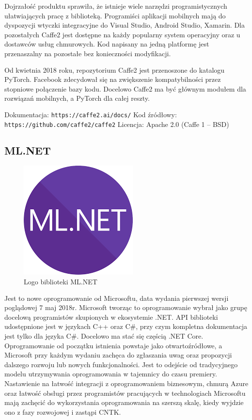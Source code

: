 \documentclass[12pt,a4paper,twoside,titlepage,openright]{book}
\begin{document}
\begin{itemize}
\begin{itemize}
Dojrzałość produktu sprawiła, że istnieje wiele narzędzi programistycznych ułatwiających pracę z biblioteką. Programiści aplikacji mobilnych mają do dyspozycji wtyczki integracyjne do Visual Studio, Android Studio, Xamarin. Dla pozostałych Caffe2 jest dostępne na każdy popularny system operacyjny oraz u dostawców usług chmurowych. Kod napisany na jedną platformę jest przenaszalny na pozostałe bez konieczności modyfikacji.

Od kwietnia 2018 roku, repozytorium Caffe2 jest przenoszone do katalogu PyTorch. Facebook zdecydował się na zwiększenie kompatybilności przez stopniowe połączenie bazy kodu. Docelowo Caffe2 ma być głównym modułem dla rozwiązań mobilnych, a PyTorch dla całej reszty.

\noindent
\newline
Dokumentacja: \texttt{https://caffe2.ai/docs/}
\newline
Kod źródłowy: \texttt{https://github.com/caffe2/caffe2}
\newline
Licencja: Apache 2.0 (Caffe 1 -- BSD)


\subsection{ML.NET}
\begin{figure}[h]
	\centering
			\includegraphics[resolution=100, scale=1]{ML_NET.png}
		\caption{Logo biblioteki ML.NET}
\end{figure}
Jest to nowe oprogramowanie od Microsoftu, data wydania pierwszej wersji poglądowej 7 maj 2018r. Microsoft tworząc to oprogramowanie wybrał jako grupę docelową programistów skupionych w ekosystemie .NET. API biblioteki udostępnione jest w językach C++ oraz C\#, przy czym kompletna dokumentacja jest tylko dla języka C\#. Docelowo ma stać się częścią .NET Core. Oprogramowanie od początku istnienia powstaje jako otwartoźródłowe, a Microsoft przy każdym wydaniu zachęca do zgłaszania uwag oraz propozycji dalszego rozwoju lub nowych funkcjonalności. Jest to odejście od tradycyjnego modelu utrzymywania oprogramowania w tajemnicy do czasu premiery. Nastawienie na łatwość integracji z oprogramowaniem biznesowym, chmurą Azure oraz łatwość obsługi przez programistów pracujących w technologiach Microsoftu mają zachęcić do wykorzystania oprogramowania na szerszą skalę, kiedy wyjdzie ono z fazy rozwojowej i zastąpi CNTK.


\end{itemize}
\end{itemize}
\end{document}
